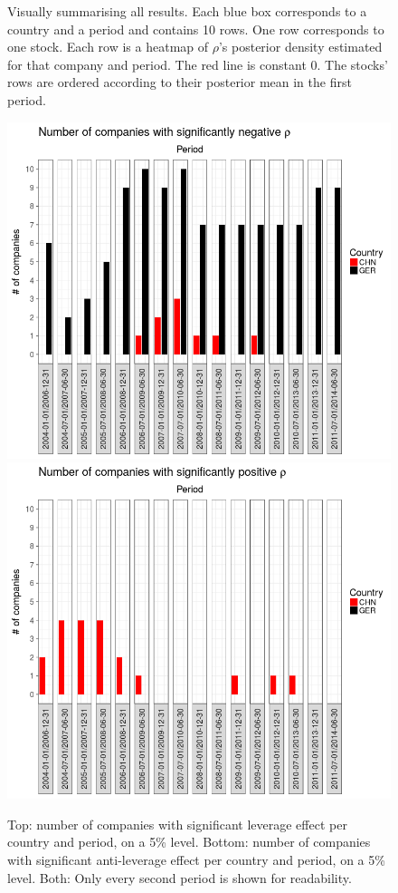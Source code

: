 \begin{figure}[p]
	\caption[Visually summarising all results]{Visually summarising all results. Each blue box corresponds to a country and a period and contains 10 rows. One row corresponds to one stock. Each row is a heatmap of $\rho$'s posterior density estimated for that company and period. The red line is constant 0. The stocks' rows are ordered according to their posterior mean in the first period.}
	\label{fig:rhos}
\end{figure}


\begin{figure}[p]
	\vspace*{-3.2cm}
	\centering
	\includegraphics[width=\linewidth]{../calculations/negative-rhos}
	\includegraphics[width=\linewidth]{../calculations/positive-rhos}
	\caption[Significant leverage effect]{Top: number of companies with significant leverage effect per country and period, on a 5\% level. Bottom: number of companies with significant anti-leverage effect per country and period, on a 5\% level. Both: Only every second period is shown for readability.}
	\label{fig:negative-rhos}
\end{figure}


